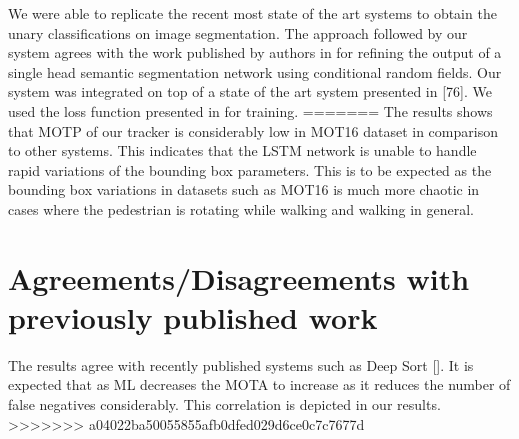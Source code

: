 We were able to replicate the recent most state of the art systems to obtain the unary classifications on image segmentation. The approach followed by our system agrees with the work published by authors in \cite{Zhen_ICCV15_CRFRNN} for refining the output of a single head semantic segmentation network using conditional random fields. Our system was integrated on top of a state of the art system presented in [76]. We used the loss function presented in \cite{Anurag17} for training.  
=======
The results shows that MOTP of our tracker is considerably low in MOT16 dataset in comparison to other systems. This indicates that the LSTM network is unable to handle rapid variations of the bounding box parameters. This is to be expected as the bounding box variations in datasets such as MOT16 is much more chaotic in cases where the pedestrian is rotating while walking and walking in general.

\section{Agreements/Disagreements with previously published work}
The results agree with recently published systems such as Deep Sort []. It is expected that as ML decreases the MOTA to increase as it reduces the number of false negatives considerably. This correlation is depicted in our results.
>>>>>>> a04022ba50055855afb0dfed029d6ce0c7c7677d
